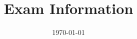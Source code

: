 


% 





\newif\ifsectiona

\newif\ifquant

\ifsectiona%
    \newcommand{\sectionaonly}[1]{#1}%
\else%
    \newcommand{\sectionaonly}[1]{}%
\fi

\ifquant%
    \newcommand{\quantonly}[1]{#1}%
\else%
    \newcommand{\quantonly}[1]{}%
\fi

\title[Exam Information]{Exam Information}
\date{\today}


